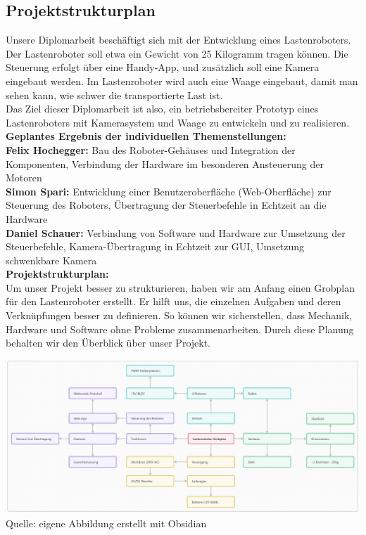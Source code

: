 \documentclass[ngerman,12pt,a4paper]{article}
\begin{document}
		\subsection{Projektstrukturplan} %
		Unsere Diplomarbeit beschäftigt sich mit der Entwicklung eines Lastenroboters. Der Lastenroboter soll etwa ein Gewicht von 25 Kilogramm tragen können. Die Steuerung erfolgt über eine Handy-App, und zusätzlich soll eine Kamera eingebaut werden. Im Lastenroboter wird auch eine Waage eingebaut, damit man sehen kann, wie schwer die transportierte Last ist. \\ Das Ziel dieser Diplomarbeit ist also, ein betriebsbereiter Prototyp eines Lastenroboters mit Kamerasystem und Waage zu entwickeln und zu realisieren. \\[0.4cm]
		\textbf{Geplantes Ergebnis der individuellen Themenstellungen:} \\
		\textbf{Felix Hochegger:}
		Bau des Roboter-Gehäuses und Integration der Komponenten, Verbindung der Hardware im besonderen Ansteuerung der Motoren \\
		\textbf{Simon Spari:}
		Entwicklung einer Benutzeroberfläche (Web-Oberfläche) zur Steuerung des Roboters, Übertragung der Steuerbefehle in Echtzeit an die Hardware \\
		\textbf{Daniel Schauer:}
		Verbindung von Software und Hardware zur Umsetzung der Steuerbefehle, Kamera-Übertragung in Echtzeit zur GUI, Umsetzung schwenkbare Kamera\\[0.4cm]
		\textbf{Projektstrukturplan:} \\
		Um unser Projekt besser zu strukturieren, haben wir am Anfang einen Grobplan für den Lastenroboter erstellt. Er hilft uns, die einzelnen Aufgaben und deren Verknüpfungen besser zu definieren. So können wir sicherstellen, dass Mechanik, Hardware und Software ohne Probleme zusammenarbeiten. Durch diese Planung behalten wir den Überblick über unser Projekt.
		\begin{center}
			\begin{minipage}{\textwidth}
				\centering
				\includegraphics[scale=0.42]{Pictures/Projekt-Grobplan}
				\label{fig:sprojekt_grobplan}
				\vspace{-4pt}
				{\small Quelle: eigene Abbildung erstellt mit Obsidian}
			\end{minipage}
		\end{center}
		\newpage
\end{document}
